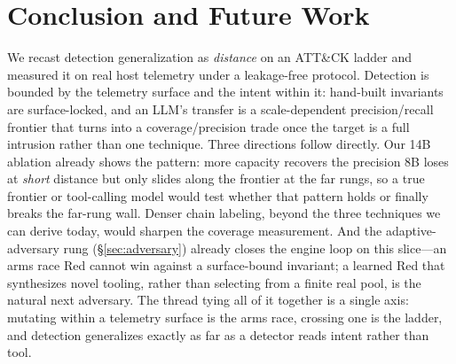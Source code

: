 \documentclass[sigconf,nonacm]{acmart}
\begin{document}
\section{Conclusion and Future Work}
\label{sec:conclusion}
We recast detection generalization as \emph{distance} on an ATT\&CK ladder and
measured it on real host telemetry under a leakage-free protocol. Detection is
bounded by the telemetry surface and the intent within it: hand-built invariants
are surface-locked, and an LLM's transfer is a scale-dependent precision/recall
frontier that turns into a coverage/precision trade once the target is a full
intrusion rather than one technique. Three directions follow directly. Our 14B
ablation already shows the pattern: more capacity recovers the precision 8B loses
at \emph{short} distance but only slides along the frontier at the far rungs, so
a true frontier or tool-calling model would test whether that pattern holds or
finally breaks the far-rung wall. Denser
chain labeling, beyond the three techniques we can derive today, would sharpen
the coverage measurement. And the adaptive-adversary rung
(\S\ref{sec:adversary}) already closes the engine loop on this slice---an
arms race Red cannot win against a surface-bound invariant; a learned Red that
synthesizes novel tooling, rather than selecting from a finite real pool, is the
natural next adversary. The thread tying all of it together is a single axis:
mutating within a telemetry surface is the arms race, crossing one is the
ladder, and detection generalizes exactly as far as a detector reads intent
rather than tool.



\end{document}
